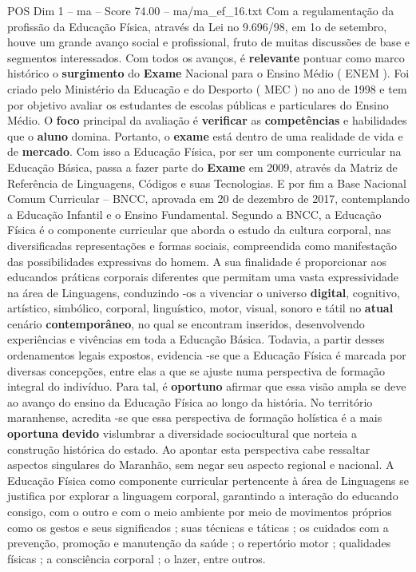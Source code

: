 \begin{textsample}{POS Dim 1 – ma – Score 74.00 – ma/ma\_ef\_16.txt}
Com a regulamentação da profissão da Educação Física, através da Lei no 9.696/98, em 1o de setembro, houve um grande avanço social e profissional, fruto de muitas discussões de base e segmentos interessados.
Com todos os avanços, é \textbf{relevante} pontuar como marco histórico o \textbf{surgimento} do \textbf{Exame} Nacional para o Ensino Médio ( ENEM ).
Foi criado pelo Ministério da Educação e do Desporto ( MEC ) no ano de 1998 e tem por objetivo avaliar os estudantes de escolas públicas e particulares do Ensino Médio.
O \textbf{foco} principal da avaliação é \textbf{verificar} as \textbf{competências} e habilidades que o \textbf{aluno} domina.
Portanto, o \textbf{exame} está dentro de uma realidade de vida e de \textbf{mercado}.
Com isso a Educação Física, por ser um componente curricular na Educação Básica, passa a fazer parte do \textbf{Exame} em 2009, através da Matriz de Referência de Linguagens, Códigos e suas Tecnologias.
E por fim a Base Nacional Comum Curricular – BNCC, aprovada em 20 de dezembro de 2017, contemplando a Educação Infantil e o Ensino Fundamental.
Segundo a BNCC, a Educação Física é o componente curricular que aborda o estudo da cultura corporal, nas diversificadas representações e formas sociais, compreendida como manifestação das possibilidades expressivas do homem.
A sua finalidade é proporcionar aos educandos práticas corporais diferentes que permitam uma vasta expressividade na área de Linguagens, conduzindo -os a vivenciar o universo \textbf{digital}, cognitivo, artístico, simbólico, corporal, linguístico, motor, visual, sonoro e tátil no \textbf{atual} cenário \textbf{contemporâneo}, no qual se encontram inseridos, desenvolvendo experiências e vivências em toda a Educação Básica.
Todavia, a partir desses ordenamentos legais expostos, evidencia -se que a Educação Física é marcada por diversas concepções, entre elas a que se ajuste numa perspectiva de formação integral do indivíduo.
Para tal, é \textbf{oportuno} afirmar que essa visão ampla se deve ao avanço do ensino da Educação Física ao longo da história.
No território maranhense, acredita -se que essa perspectiva de formação holística é a mais \textbf{oportuna} \textbf{devido} vislumbrar a diversidade sociocultural que norteia a construção histórica do estado.
Ao apontar esta perspectiva cabe ressaltar aspectos singulares do Maranhão, sem negar seu aspecto regional e nacional.
A Educação Física como componente curricular pertencente à área de Linguagens se justifica por explorar a linguagem corporal, garantindo a interação do educando consigo, com o outro e com o meio ambiente por meio de movimentos próprios como os gestos e seus significados ; suas técnicas e táticas ; os cuidados com a prevenção, promoção e manutenção da saúde ; o repertório motor ; qualidades físicas ; a consciência corporal ; o lazer, entre outros.

\end{textsample}
